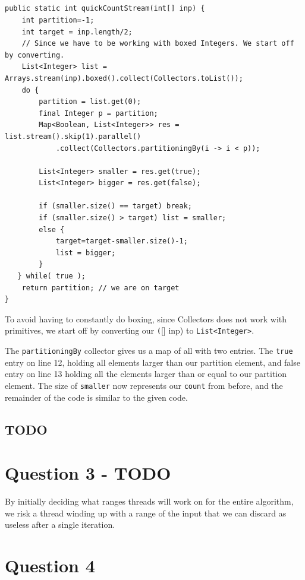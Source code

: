 \documentclass[a5paper]{article}
\begin{document}
\subsection{}

\begin{lstlisting}
public static int quickCountStream(int[] inp) {
    int partition=-1;
    int target = inp.length/2;
    // Since we have to be working with boxed Integers. We start off by converting.
    List<Integer> list = Arrays.stream(inp).boxed().collect(Collectors.toList());
    do {
        partition = list.get(0);
        final Integer p = partition;
        Map<Boolean, List<Integer>> res = list.stream().skip(1).parallel()
            .collect(Collectors.partitioningBy(i -> i < p));

        List<Integer> smaller = res.get(true);
        List<Integer> bigger = res.get(false);

        if (smaller.size() == target) break;
        if (smaller.size() > target) list = smaller;
        else {
            target=target-smaller.size()-1;
            list = bigger;
        }
   } while( true );
    return partition; // we are on target
}
\end{lstlisting}
To avoid having to constantly do boxing, since Collectors does not work with primitives,
we start off by converting our \texttt([] inp) to \texttt{List<Integer>}.

The \texttt{partitioningBy} collector gives us a map of all with two entries.
The \texttt{true} entry on line 12, holding all elements larger than our partition element, and false entry on line 13 holding
all the elements larger than or equal to our partition element. The size of \texttt{smaller} now represents our \texttt{count}
from before, and the remainder of the code is similar to the given code.

\subsection{TODO} 

\section{Question 3 - TODO}
By initially deciding what ranges threads will work on for the entire algorithm, we risk a thread winding up
with a range of the input that we can discard as useless after a single iteration. 

\section{Question 4}
\end{document}
